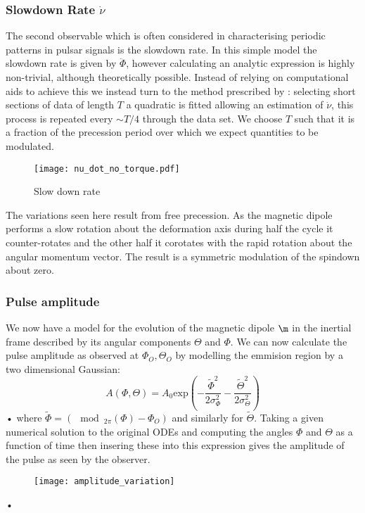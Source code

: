 \documentclass[/home/greg/Thesis/main/main.tex]{subfiles}
\begin{document}
\subsubsection{Slowdown Rate $\dot{\nu}$}
The second observable which is often considered in characterising periodic patterns in pulsar signals is the slowdown rate. In this simple model the slowdown rate is given by $\ddot{\Phi}$, however calculating an analytic expression is highly non-trivial, although theoretically possible. Instead of relying on computational aids to achieve this we instead turn to the method prescribed by \citet{Lyne2010}: selecting short sections of data of length $T$ a quadratic is fitted allowing an estimation of $\dot{\nu}$, this process is repeated every $\sim T/4$ through the data set. We choose $T$ such that it is a fraction of the precession period over which we expect quantities to be modulated.

\begin{figure}[ht]
\centering
	\texttt{[image: nu\_dot\_no\_torque.pdf]}
\caption{Slow down rate }
\label{fig:nu_dot no torque}
\end{figure}

The variations seen here result from free precession. As the magnetic dipole performs a slow rotation about the deformation axis during
half the cycle it counter-rotates and the other half it corotates with the rapid rotation about the angular momentum vector. The result 
is a symmetric modulation of the spindown about zero.

\subsubsection{Pulse amplitude}
We now have a model for the evolution of the magnetic dipole $\m$ in the inertial frame described by its angular components $\Theta$ and $\Phi$. We can now calculate the pulse amplitude as observed at $\Phi_{O}, \Theta_{O}$ by modelling the emmision region by a two dimensional Gaussian:
\begin{equation}
A(\Phi, \Theta)  = A_{0} \textrm{exp}\left(-\frac{\tilde{\Phi}^{2}}{2\sigma_{\Phi}^{2}}-\frac{\tilde{\Theta}^{2}}{2\sigma_{\Theta}^{2}}\right)
\label{eqn: Amplitude}
\end{equation}•
where $\tilde{\Phi}=\left(\mod_{2\pi}(\Phi)-\Phi_{O}\right)$ and similarly for $\tilde{\Theta}$.
Taking a given numerical solution to the original ODEs and computing the angles $\Phi$ and $\Theta$ as a function of time then insering these into this expression gives the amplitude of the pulse as seen by the observer. 
\begin{figure}[ht]
\centering
\texttt{[image: amplitude\_variation]}
\caption{}
\label{fig: amplitude_variation}
\end{figure}•
\end{document}
